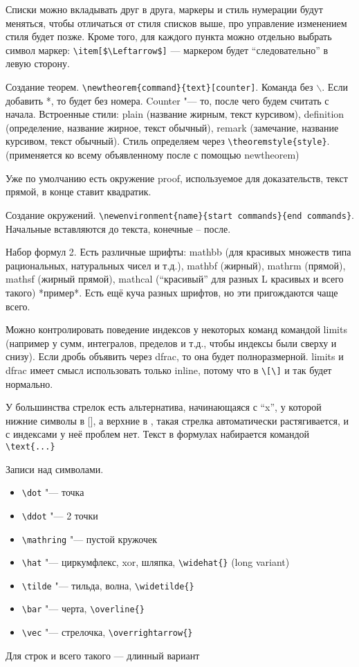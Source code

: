 \documentclass[a4paper, 12pt]{article}
\begin{document}
Списки можно вкладывать друг в друга, маркеры и стиль нумерации будут меняться, чтобы отличаться от стиля списков выше, про управление изменением стиля будет позже. Кроме того, для каждого пункта можно отдельно выбрать символ маркер: \verb|\item[$\Leftarrow$]| --- маркером будет “следовательно” в левую сторону.

Создание теорем. \verb|\newtheorem{command}{text}[counter]|. Команда без $\backslash$. Если добавить *, то будет без номера. Counter "--- то, после чего будем считать с начала. Встроенные стили: plain (название жирным, текст курсивом), definition (определение, название жирное, текст обычный), remark (замечание, название курсивом, текст обычный). Стиль определяем через \verb|\theoremstyle{style}|. (применяется ко всему объявленному после с помощью newtheorem)

Уже по умолчанию есть окружение proof, используемое для доказательств, текст прямой, в конце ставит квадратик.

Создание окружений. \verb|\newenvironment{name}{start commands}{end commands}|. Начальные вставляются до текста, конечные – после.

Набор формул 2. Есть различные шрифты: mathbb (для красивых множеств типа рациональных, натуральных чисел и т.д.), mathbf (жирный), mathrm (прямой), mathsf (жирный прямой), mathcal (“красивый” для разных L красивых и всего такого) *пример*. Есть ещё куча разных шрифтов, но эти пригождаются чаще всего.

Можно контролировать поведение индексов у некоторых команд командой limits (например у сумм, интегралов, пределов и т.д., чтобы индексы были сверху и снизу). Если дробь объявить через dfrac, то она будет полноразмерной. limits и dfrac имеет смысл использовать только inline, потому что в \verb|\[\]| и так будет нормально.

У большинства стрелок есть альтернатива, начинающаяся с “x”, у которой нижние символы в [], а верхние в {}, такая стрелка автоматически растягивается, и с индексами у неё проблем нет.
Текст в формулах набирается командой \verb|\text{...}|

Записи над символами.
\begin{itemize}
	\item \verb|\dot| "--- точка
	\item \verb|\ddot| "--- 2 точки
	\item \verb|\mathring| "--- пустой кружочек
	\item \verb|\hat| "--- циркумфлекс, xor, шляпка, \verb|\widehat{}| (long variant)
	\item \verb|\tilde| "--- тильда, волна, \verb|\widetilde{}|
	\item \verb|\bar| "--- черта, \verb|\overline{}|
	\item \verb|\vec| "--- стрелочка, \verb|\overrightarrow{}|
\end{itemize}
Для строк и всего такого --- длинный вариант
\end{document}
